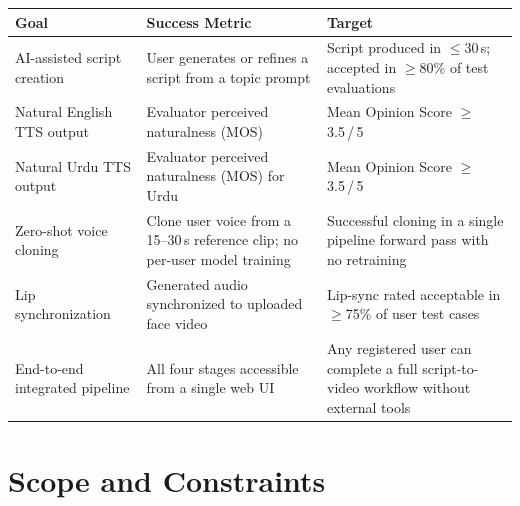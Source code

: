﻿\documentclass[12pt, a4paper]{article}
\newcommand{\thead}[1]{\cellcolor{headerbg}\textcolor{headertext}{\textbf{#1}}}
\newcommand{\talt}{\rowcolor{rowalt}}
\begin{document}
\begin{tabular}{>{\raggedright\arraybackslash}p{4.0cm}
                >{\raggedright\arraybackslash}p{4.2cm}
                >{\raggedright\arraybackslash}p{6.4cm}}
  \toprule
  \thead{Goal} & \thead{Success Metric} & \thead{Target} \\
  \midrule
  AI-assisted script creation
    & User generates or refines a script from a topic prompt
    & Script produced in $\leq$30\,s; accepted in $\geq$80\% of test evaluations \\
  \talt
  Natural English TTS output
    & Evaluator perceived naturalness (MOS)
    & Mean Opinion Score $\geq$ 3.5\,/\,5 \\
  Natural Urdu TTS output
    & Evaluator perceived naturalness (MOS) for Urdu
    & Mean Opinion Score $\geq$ 3.5\,/\,5 \\
  \talt
  Zero-shot voice cloning
    & Clone user voice from a 15--30\,s reference clip; no per-user model training
    & Successful cloning in a single pipeline forward pass with no retraining \\
  Lip synchronization
    & Generated audio synchronized to uploaded face video
    & Lip-sync rated acceptable in $\geq$75\% of user test cases \\
  \talt
  End-to-end integrated pipeline
    & All four stages accessible from a single web UI
    & Any registered user can complete a full script-to-video workflow without external tools \\
  \bottomrule
\end{tabular}

\section{Scope and Constraints}
\end{document}
